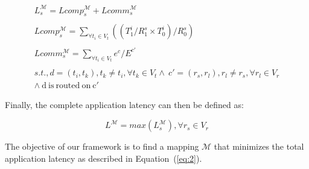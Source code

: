 \documentclass[10pt, conference, compsocconf]{IEEEtran}
\begin{document}
\begin{figure}[h!]
\begin{scriptsize}
\begin{equation}
  \begin{array}{c}
    L^{\mathcal{M}}_s = Lcomp^{\mathcal{M}}_s +
    Lcomm^{\mathcal{M}}_s\\
    \\Lcomp^{\mathcal{M}}_s =
    \sum_{\forall t_i \in V_t} ((T^i_1/R^s_1\times T^i_0)/R^s_0)\\
    \\Lcomm^{\mathcal{M}}_s =
    \sum_{\forall t_i \in V_t} e^c / E^{c'}\\
    \\s.t., d = (t_i,t_k), t_k \neq t_i, \forall t_k
    \in V_t \wedge\  c' = (r_s,r_l), r_l \neq r_s, \forall r_l \in V_r \\
    \wedge\ \mathrm{d\ is\ routed\ on\ c'}
  \end{array}
  \label{eq:1}
\end{equation}
\end{scriptsize}
\end{figure}

\vspace{-3mm}

Finally, the complete application latency can then be defined as:
\begin{scriptsize}
\begin{equation}
  \label{eq:2}
  L^{\mathcal{M}} = max ({L^{\mathcal{M}}_s}), \forall r_s \in V_r
\end{equation}
\end{scriptsize}

\vspace{-6mm}

The objective of our framework is to find a mapping $\mathcal{M}$
that minimizes the total application latency as described in
Equation~(\ref{eq:2}).

\end{document}
